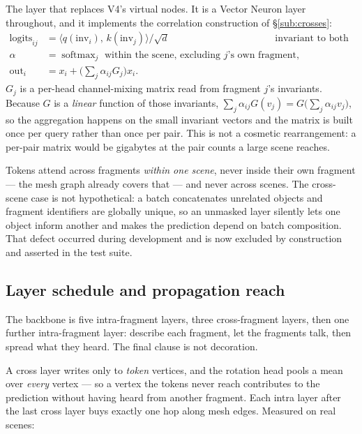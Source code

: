 \documentclass[11pt,a4paper]{report}
\begin{document}
The layer that replaces V4's virtual nodes. It is a Vector Neuron layer
throughout, and it implements the correlation construction of \S\ref{sub:crosses}:
\[
\begin{aligned}
\text{logits}_{ij} &= \langle q(\mathrm{inv}_i),\, k(\mathrm{inv}_j)\rangle / \sqrt{d}
&&\text{invariant to both poses,}\\
\alpha &= \operatorname{softmax}_j \text{ within the scene, excluding } j\text{'s own fragment,}\\
\mathrm{out}_i &= x_i + \Big(\sum_j \alpha_{ij} G_j\Big) x_i .
\end{aligned}
\]
$G_j$ is a per-head channel-mixing matrix read from fragment $j$'s invariants.
Because $G$ is a \emph{linear} function of those invariants,
$\sum_j \alpha_{ij} G(v_j) = G\big(\sum_j \alpha_{ij} v_j\big)$, so the
aggregation happens on the small invariant vectors and the matrix is built once
per query rather than once per pair. This is not a cosmetic rearrangement: a
per-pair matrix would be gigabytes at the pair counts a large scene reaches.

Tokens attend across fragments \emph{within one scene}, never inside their own
fragment --- the mesh graph already covers that --- and never across scenes. The
cross-scene case is not hypothetical: a batch concatenates unrelated objects and
fragment identifiers are globally unique, so an unmasked layer silently lets one
object inform another and makes the prediction depend on batch composition. That
defect occurred during development and is now excluded by construction and
asserted in the test suite.

\subsection{Layer schedule and propagation reach}
\label{sub:schedule}

The backbone is five intra-fragment layers, three cross-fragment layers, then
one further intra-fragment layer: describe each fragment, let the fragments
talk, then spread what they heard. The final clause is not decoration.

A cross layer writes only to \emph{token} vertices, and the rotation head pools
a mean over \emph{every} vertex --- so a vertex the tokens never reach
contributes to the prediction without having heard from another fragment. Each
intra layer after the last cross layer buys exactly one hop along mesh edges.
Measured on real scenes:
\end{document}
